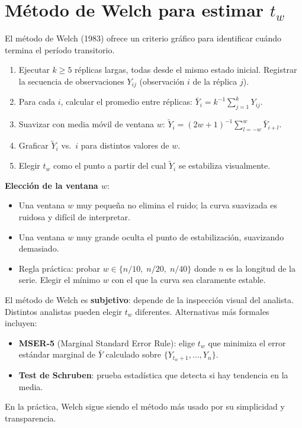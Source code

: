 \documentclass[11pt, letterpaper]{article}
\begin{document}
\section{Método de Welch para estimar $t_w$}

El método de Welch (1983) ofrece un criterio gráfico para identificar cuándo termina el período transitorio.

\begin{metodobox}
\begin{enumerate}
    \item Ejecutar $k \ge 5$ réplicas largas, todas desde el mismo estado inicial. Registrar la secuencia de observaciones $Y_{ij}$ (observación $i$ de la réplica $j$).
    \item Para cada $i$, calcular el promedio entre réplicas: $\bar Y_i = k^{-1}\sum_{j=1}^k Y_{ij}$.
    \item Suavizar con media móvil de ventana $w$: $\tilde Y_i = (2w+1)^{-1}\sum_{l=-w}^{w}\bar Y_{i+l}$.
    \item Graficar $\tilde Y_i$ vs.\ $i$ para distintos valores de $w$.
    \item Elegir $t_w$ como el punto a partir del cual $\tilde Y_i$ se estabiliza visualmente.
\end{enumerate}
\end{metodobox}

\textbf{Elección de la ventana $w$}:

\begin{itemize}
    \item Una ventana $w$ muy pequeña no elimina el ruido; la curva suavizada es ruidosa y difícil de interpretar.
    \item Una ventana $w$ muy grande oculta el punto de estabilización, suavizando demasiado.
    \item Regla práctica: probar $w \in \{n/10,\; n/20,\; n/40\}$ donde $n$ es la longitud de la serie. Elegir el mínimo $w$ con el que la curva sea claramente estable.
\end{itemize}

\begin{notabox}
El método de Welch es \textbf{subjetivo}: depende de la inspección visual del analista. Distintos analistas pueden elegir $t_w$ diferentes. Alternativas más formales incluyen:
\begin{itemize}
    \item \textbf{MSER-5} (Marginal Standard Error Rule): elige $t_w$ que minimiza el error estándar marginal de $\bar Y$ calculado sobre $\{Y_{t_w+1}, \ldots, Y_n\}$.
    \item \textbf{Test de Schruben}: prueba estadística que detecta si hay tendencia en la media.
\end{itemize}
En la práctica, Welch sigue siendo el método más usado por su simplicidad y transparencia.
\end{notabox}
\end{document}
